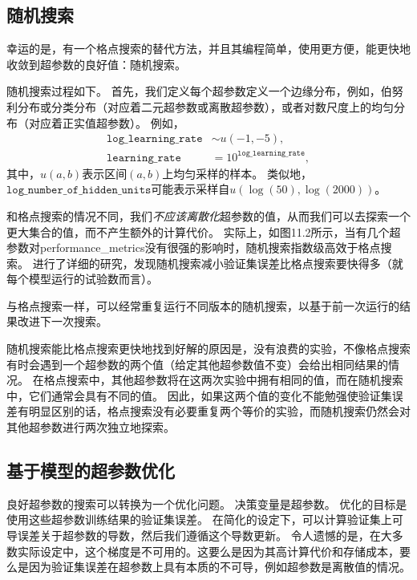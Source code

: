 \subsection{随机搜索}
\label{sec:random_search}
幸运的是，有一个格点搜索的替代方法，并且其编程简单，使用更方便，能更快地收敛到超参数的良好值：随机搜索\citep{Bergstra+Bengio-2012-small}。

随机搜索过程如下。
首先，我们定义每个超参数定义一个边缘分布，例如，伯努利分布或分类分布（对应着二元超参数或离散超参数），或者对数尺度上的均匀分布（对应着正实值超参数）。
例如，
\begin{align}
	\texttt{log\_learning\_rate} &\sim u(-1, -5), \\
	\texttt{learning\_rate} &= 10^{\texttt{log\_learning\_rate}},
\end{align}
其中，$u(a,b)$表示区间$(a,b)$上均匀采样的样本。
类似地，$\texttt{log\_number\_of\_hidden\_units}$可能表示采样自$u(\log(50), \log(2000))$。

和格点搜索的情况不同，我们\emph{不应该离散化}超参数的值，从而我们可以去探索一个更大集合的值，而不产生额外的计算代价。
实际上，如图11.2所示，当有几个超参数对\gls{performance_metrics}没有很强的影响时，随机搜索指数级高效于格点搜索。
\cite{Bergstra+Bengio-2012-small}进行了详细的研究，发现随机搜索减小验证集误差比格点搜索要快得多（就每个模型运行的试验数而言）。

与格点搜索一样，可以经常重复运行不同版本的随机搜索，以基于前一次运行的结果改进下一次搜索。

随机搜索能比格点搜索更快地找到好解的原因是，没有浪费的实验，不像格点搜索有时会遇到一个超参数的两个值（给定其他超参数值不变）会给出相同结果的情况。
在格点搜索中，其他超参数将在这两次实验中拥有相同的值，而在随机搜索中，它们通常会具有不同的值。
因此，如果这两个值的变化不能勉强使验证集误差有明显区别的话，格点搜索没有必要重复两个等价的实验，而随机搜索仍然会对其他超参数进行两次独立地探索。


\subsection{基于模型的超参数优化}
\label{sec:model_based_hyperparameter_optimization}
良好超参数的搜索可以转换为一个优化问题。
决策变量是超参数。
优化的目标是使用这些超参数训练结果的验证集误差。
在简化的设定下，可以计算验证集上可导误差关于超参数的导数，然后我们遵循这个导数更新\citep{bengio:1999:snowbird,bengio-hyper-NC00,maclaurin2015gradient}。
令人遗憾的是，在大多数实际设定中，这个梯度是不可用的。这要么是因为其高计算代价和存储成本，要么是因为验证集误差在超参数上具有本质的不可导，例如超参数是离散值的情况。

